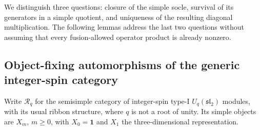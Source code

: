 \documentclass[11pt,a4paper]{article}
\numberwithin{equation}{section}
\theoremstyle{definition}\newtheorem{definition}[theorem]{Definition}
\theoremstyle{remark}\newtheorem{remark}[theorem]{Remark}
\begin{document}
We distinguish three questions: closure of the simple socle, survival of its
generators in a simple quotient, and uniqueness of the resulting diagonal
multiplication.  The following lemmas address the last two questions without
assuming that every fusion-allowed operator product is already nonzero.

\subsection{Object-fixing automorphisms of the generic integer-spin category}

Write $\mathcal R_q$ for the semisimple category of integer-spin type-I
$U_q(\mathfrak {sl}_2)$ modules, with its usual ribbon structure, where
$q$ is not a root of unity.  Its simple objects are $X_m$, $m\geq0$,
with $X_0=\mathbf1$ and $X_1$ the three-dimensional representation.
\end{document}
